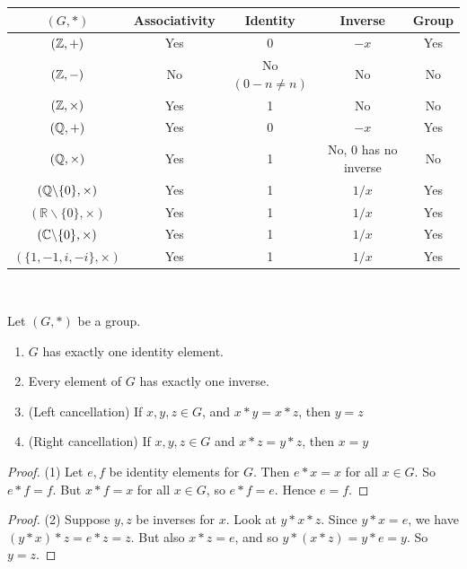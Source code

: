 \documentclass[10pt]{scrartcl}
\begin{document}
\begin{examples}
{\renewcommand{\arraystretch}{1.3}
\begin{table}[H]
\centering
    \begin{tabular}{ccccc}
    \hline
    $(G, *)$ & Associativity & Identity & Inverse & Group \\ \hline
    $(\mathbb{Z},+)$ & Yes & $0$ & $-x$ & Yes \\
    $(\mathbb{Z},-) $  & No & No {\tiny $(0 -n \neq n)$} & No & No\\
    $(\mathbb{Z}, \times)$ & Yes & 1 & No & No \\
    $(\mathbb{Q}, +)$ & Yes & $0$ & $-x$ & Yes\\
    $(\mathbb{Q},\times)$ & Yes & 1 & No, {\tiny 0 has no inverse} & No\\
    $(\mathbb{Q}\backslash\{0\},\times)$ & Yes & 1 & $1/x$ & Yes\\ 
    $( \mathbb{R}\backslash\{0\},\times)$ & Yes & 1 & $1/x$ & Yes\\ 
    $(\mathbb{C} \backslash\{0\},\times)$ & Yes & 1 & $1/x$ & Yes\\ 
    $(\{1,-1,i,-i\},\times)$ & Yes & 1 & $1/x$ & Yes\vspace*{-5pt}
    \end{tabular}
\end{table}
}
\end{examples}~

\begin{proposition} Let $(G,*)$ be a group. \begin{enumerate}
 \item $G$ has exactly one identity element.
 \item Every element of $G$ has exactly one inverse.
 \item (Left cancellation) If $x,y,z \in G$, and $x*y = x*z$, then $y = z$
 \item (Right cancellation) If $x,y,z \in G$ and $x*z = y*z$, then $x = y$
 \end{enumerate}
 \end{proposition}

\begin{proof} (1)     
 Let $e,f$ be identity elements for $G$. Then $e*x = x$ for all $x \in G$.  So $e*f = f$. But $x*f = x$ for all $x \in G$, so $e*f = e$. Hence $e = f$.
\end{proof}

\begin{proof} (2) Suppose $y, z$ be inverses for $x$. Look at $y*x*z$. Since $y*x = e$, we have $(y*x)*z = e*z = z$. But also $x*z = e$, and so $y*(x*z) = y*e = y$. So $y = z$.
\end{proof}
\end{document}
